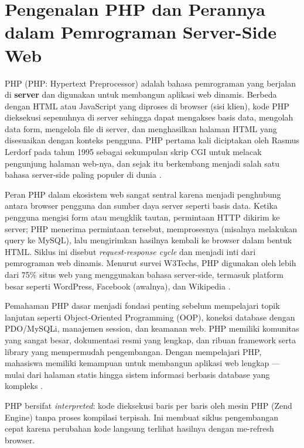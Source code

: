 \section{Pengenalan PHP dan Perannya dalam Pemrograman Server-Side Web}

PHP (PHP: Hypertext Preprocessor) adalah bahasa pemrograman yang berjalan di \textbf{server} dan digunakan untuk membangun aplikasi web dinamis. Berbeda dengan HTML atau JavaScript yang diproses di browser (sisi klien), kode PHP dieksekusi sepenuhnya di server sehingga dapat mengakses basis data, mengolah data form, mengelola file di server, dan menghasilkan halaman HTML yang disesuaikan dengan konteks pengguna. PHP pertama kali diciptakan oleh Rasmus Lerdorf pada tahun 1995 sebagai sekumpulan skrip CGI untuk melacak pengunjung halaman web-nya, dan sejak itu berkembang menjadi salah satu bahasa server-side paling populer di dunia \cite{phpManual}.

Peran PHP dalam ekosistem web sangat sentral karena menjadi penghubung antara browser pengguna dan sumber daya server seperti basis data. Ketika pengguna mengisi form atau mengklik tautan, permintaan HTTP dikirim ke server; PHP menerima permintaan tersebut, memprosesnya (misalnya melakukan query ke MySQL), lalu mengirimkan hasilnya kembali ke browser dalam bentuk HTML. Siklus ini disebut \textit{request-response cycle} dan menjadi inti dari pemrograman web dinamis. Menurut survei W3Techs, PHP digunakan oleh lebih dari 75\% situs web yang menggunakan bahasa server-side, termasuk platform besar seperti WordPress, Facebook (awalnya), dan Wikipedia \cite{w3schoolsPhp}.

Pemahaman PHP dasar menjadi fondasi penting sebelum mempelajari topik lanjutan seperti Object-Oriented Programming (OOP), koneksi database dengan PDO/MySQLi, manajemen session, dan keamanan web. PHP memiliki komunitas yang sangat besar, dokumentasi resmi yang lengkap, dan ribuan framework serta library yang mempermudah pengembangan. Dengan mempelajari PHP, mahasiswa memiliki kemampuan untuk membangun aplikasi web lengkap --- mulai dari halaman statis hingga sistem informasi berbasis database yang kompleks \cite{phpRightWay}.

\begin{catatan}
PHP bersifat \textit{interpreted}: kode dieksekusi baris per baris oleh mesin PHP (Zend Engine) tanpa proses kompilasi terpisah. Ini membuat siklus pengembangan cepat karena perubahan kode langsung terlihat hasilnya dengan me-refresh browser.
\end{catatan}

